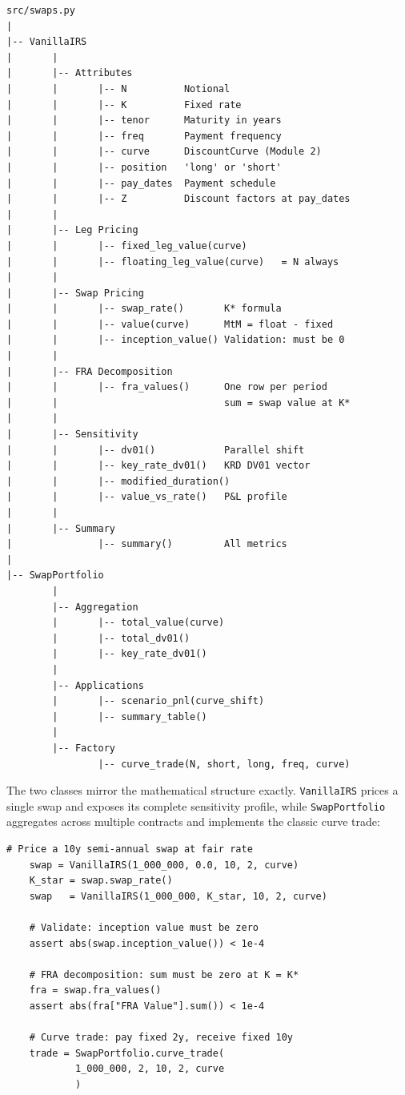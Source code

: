 \documentclass{article}
\theoremstyle{definition}  %
\theoremstyle{plain}  %
\numberwithin{definition}{section}
\numberwithin{proposition}{section}
\numberwithin{theorem}{section}
\numberwithin{equation}{section}
\begin{document}
\begin{verbatim}
src/swaps.py
|
|-- VanillaIRS
|       |
|       |-- Attributes
|       |       |-- N          Notional
|       |       |-- K          Fixed rate
|       |       |-- tenor      Maturity in years
|       |       |-- freq       Payment frequency
|       |       |-- curve      DiscountCurve (Module 2)
|       |       |-- position   'long' or 'short'
|       |       |-- pay_dates  Payment schedule
|       |       |-- Z          Discount factors at pay_dates
|       |
|       |-- Leg Pricing
|       |       |-- fixed_leg_value(curve)
|       |       |-- floating_leg_value(curve)   = N always
|       |
|       |-- Swap Pricing
|       |       |-- swap_rate()       K* formula
|       |       |-- value(curve)      MtM = float - fixed
|       |       |-- inception_value() Validation: must be 0
|       |
|       |-- FRA Decomposition
|       |       |-- fra_values()      One row per period
|       |                             sum = swap value at K*
|       |
|       |-- Sensitivity
|       |       |-- dv01()            Parallel shift
|       |       |-- key_rate_dv01()   KRD DV01 vector
|       |       |-- modified_duration()
|       |       |-- value_vs_rate()   P&L profile
|       |
|       |-- Summary
|               |-- summary()         All metrics
|
|-- SwapPortfolio
        |
        |-- Aggregation
        |       |-- total_value(curve)
        |       |-- total_dv01()
        |       |-- key_rate_dv01()
        |
        |-- Applications
        |       |-- scenario_pnl(curve_shift)
        |       |-- summary_table()
        |
        |-- Factory
                |-- curve_trade(N, short, long, freq, curve)
\end{verbatim}

The two classes mirror the mathematical structure 
exactly. \texttt{VanillaIRS} prices a single swap and 
exposes its complete sensitivity profile, while 
\texttt{SwapPortfolio} aggregates across multiple 
contracts and implements the classic curve trade:

\begin{lstlisting}[style=Pythonstyle]
    # Price a 10y semi-annual swap at fair rate
    swap = VanillaIRS(1_000_000, 0.0, 10, 2, curve)
    K_star = swap.swap_rate()
    swap   = VanillaIRS(1_000_000, K_star, 10, 2, curve)

    # Validate: inception value must be zero
    assert abs(swap.inception_value()) < 1e-4

    # FRA decomposition: sum must be zero at K = K*
    fra = swap.fra_values()
    assert abs(fra["FRA Value"].sum()) < 1e-4

    # Curve trade: pay fixed 2y, receive fixed 10y
    trade = SwapPortfolio.curve_trade(
            1_000_000, 2, 10, 2, curve
            )
\end{lstlisting}
\end{document}
